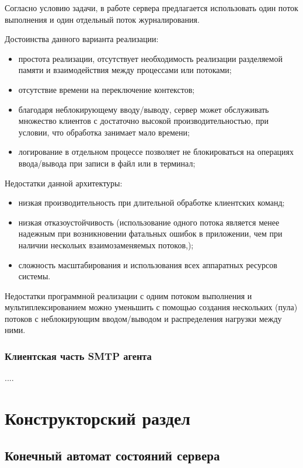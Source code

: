 \documentclass[a4paper,12pt]{report}
\begin{document}
Согласно условию задачи, в работе сервера предлагается использовать один поток выполнения и один отдельный поток
журналирования.

Достоинства данного варианта реализации:
\begin{itemize}
    \item простота реализации, отсутствует необходимость реализации разделяемой памяти и взаимодействия между процессами или потоками;
    \item отсутствие времени на переключение контекстов;
    \item благодаря неблокирующему вводу/выводу, сервер может обслуживать множество клиентов с достаточно высокой производительностью, при условии, что обработка занимает мало времени;
    \item логирование в отдельном процессе позволяет не блокироваться на операциях ввода/вывода при записи в файл или в терминал;
\end{itemize}

Недостатки данной архитектуры:
\begin{itemize}
    \item низкая производительность при длительной обработке клиентских команд;
    \item низкая отказоустойчивость (использование одного потока является менее надежным при возникновении фатальных ошибок в приложении, чем при наличии нескольих взаимозаменяемых потоков,);
    \item сложность масштабирования и использования всех аппаратных ресурсов системы.
\end{itemize}

Недостатки программной реализации с одним потоком выполнения и мультиплексированием можно уменьшить с  помощью
создания нескольких (пула) потоков с неблокирующим вводом/выводом и распределения нагрузки между ними.

\subsection*{Клиентская часть SMTP агента}

.... %

\chapter{Конструкторский раздел}

\section{Конечный автомат состояний сервера}
\end{document}
